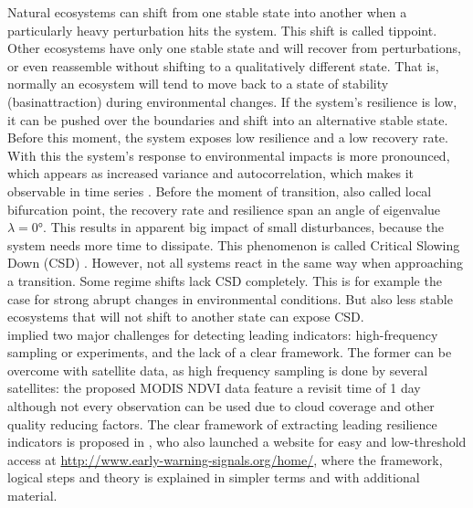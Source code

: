 Natural ecosystems can shift from one stable state into another when a particularly heavy perturbation hits the system. This shift is called \gls{tippoint}. Other ecosystems have only one stable state and will recover from perturbations, or even reassemble without shifting to a qualitatively different state. That is, normally an ecosystem will tend to move back to a state of stability (\gls{basinattraction}) during environmental changes. If the system's resilience is low, it can be pushed over the boundaries and shift into an alternative stable state. Before this moment, the system exposes low resilience and a low recovery rate. With this the system's response to environmental impacts is more pronounced, which appears as increased variance and autocorrelation, which makes it observable in time series \citep{dakos2014}. Before the moment of transition, also called local bifurcation point, the recovery rate and \gls{resilience} span an angle of eigenvalue $\lambda = \ang{0}$. This results in apparent big impact of small disturbances, because the system needs more time to dissipate. This phenomenon is called Critical Slowing Down (CSD) \citep{dakos2014}. However, not all systems react in the same way when approaching a transition. Some regime shifts lack CSD completely. This is for example the case for strong abrupt changes in environmental conditions. But also less stable ecosystems that will not shift to another state can expose CSD.\\
\cite{dakos2012} implied two major challenges for detecting leading indicators: high-frequency sampling or experiments, and the lack of a clear framework. The former can be overcome with satellite data, as high frequency sampling is done by several satellites: the proposed MODIS NDVI data feature a revisit time of 1 day although not every observation can be used due to cloud coverage and other quality reducing factors. The clear framework of extracting leading resilience indicators is proposed in \cite{dakos2014}, who also launched a website for easy and low-threshold access at \url{http://www.early-warning-signals.org/home/}, where the framework, logical steps and theory is explained in simpler terms and with additional material.\\
